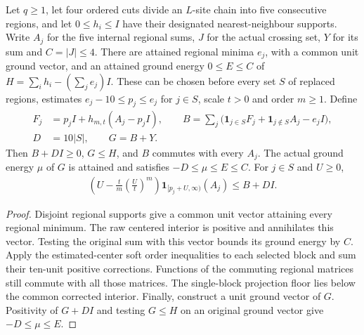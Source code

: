 \begin{lemma}
    \label{lem:alvv_five_soft_structure}
    \leanok
    Let $q\geq1$, let four ordered cuts divide an $L$-site chain into
    five consecutive regions, and let $0\leq h_i\leq I$ have their
    designated nearest-neighbour supports. Write $A_j$ for the five
    internal regional sums, $J$ for the actual crossing set, $Y$ for
    its sum and $C=|J|\leq4$.
    There are attained regional minima $e_j$, with a common unit
    ground vector, and an attained ground energy $0\leq E\leq C$ of
    $H=\sum_i h_i-(\sum_j e_j)I$.
    These can be chosen before every set $S$ of replaced regions,
    estimates $e_j-10\leq p_j\leq e_j$ for $j\in S$, scale $t>0$
    and order $m\geq1$. Define
    \begin{align}
        F_j & =p_jI+h_{m,t}(A_j-p_jI),\qquad
        B=\sum_j\bigl(\mathbf1_{j\in S}F_j+
        \mathbf1_{j\notin S}A_j-e_jI\bigr),  \\
        D   & =10|S|,\qquad G=B+Y.
    \end{align}
    Then $B+DI\geq0$, $G\leq H$, and $B$ commutes with every $A_j$.
    The actual ground energy $\mu$ of $G$ is attained and satisfies
    $-D\leq\mu\leq E\leq C$. For $j\in S$ and $U\geq0$,
    \begin{align}
        \left(U-\frac{t}{m}\left(\frac Ut\right)^m\right)
        \mathbf1_{[p_j+U,\infty)}(A_j)\leq B+DI.
    \end{align}
\end{lemma}
\begin{proof}\leanok
    Disjoint regional supports give a common unit vector attaining
    every regional minimum. The raw centered interior is positive
    and annihilates this vector. Testing the original sum with this
    vector bounds its ground energy by $C$.
    Apply the estimated-center soft order inequalities to each
    selected block and sum their ten-unit positive corrections.
    Functions of the commuting regional matrices still commute with
    all those matrices. The single-block projection floor lies below
    the common corrected interior. Finally, construct a unit ground
    vector of $G$. Positivity of $G+DI$ and testing $G\leq H$ on an
    original ground vector give $-D\leq\mu\leq E$.
\end{proof}

